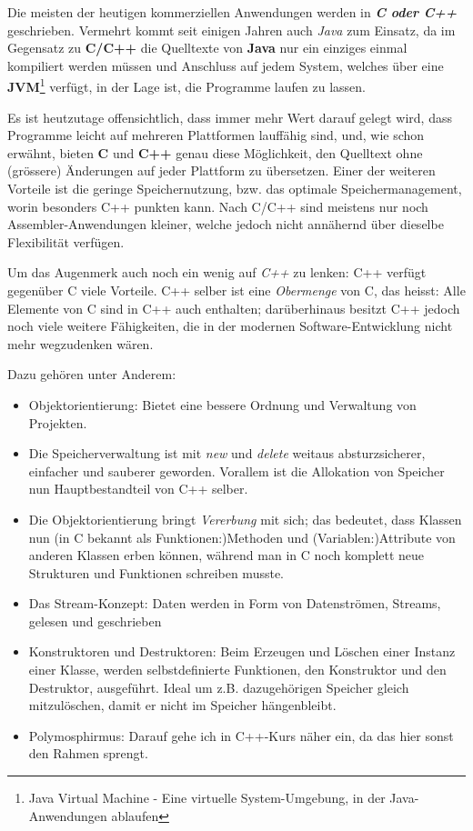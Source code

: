 \documentclass[b5paper,10pt,dvips,fleqn,titlepage,twoside]{book}
\begin{document}
Die meisten der heutigen kommerziellen Anwendungen werden in \emph{\textbf{C oder C++}} geschrieben. Vermehrt kommt seit einigen Jahren auch \emph{Java} zum Einsatz, da im Gegensatz zu \textbf{C/C++} die Quelltexte von \textbf{Java} nur ein einziges einmal kompiliert werden müssen und Anschluss auf jedem System, welches über eine \textbf{\textbf{JVM}}\footnote{Java Virtual Machine - Eine virtuelle System-Umgebung, in der Java-Anwendungen ablaufen} verfügt, in der Lage ist, die Programme laufen zu lassen.

Es ist heutzutage offensichtlich, dass immer mehr Wert darauf gelegt wird, dass Programme leicht auf mehreren Plattformen lauffähig sind, und, wie schon erwähnt, bieten \textbf{C} und \textbf{C++} genau diese Möglichkeit, den Quelltext ohne (grössere) Änderungen auf jeder Plattform zu übersetzen. Einer der weiteren Vorteile ist die geringe Speichernutzung, bzw. das optimale Speichermanagement, worin besonders C++ punkten kann. Nach C/C++ sind meistens nur noch Assembler-Anwendungen kleiner, welche jedoch nicht annähernd über dieselbe Flexibilität verfügen.

Um das Augenmerk auch noch ein wenig auf \emph{C++} zu lenken: C++ verfügt gegenüber C viele Vorteile. C++ selber ist eine \emph{Obermenge} von C, das heisst: Alle Elemente von C sind in C++ auch enthalten; darüberhinaus besitzt C++ jedoch noch viele weitere Fähigkeiten, die in der modernen Software-Entwicklung nicht mehr wegzudenken wären.

Dazu gehören unter Anderem:\newline

\begin{itemize}
 \item Objektorientierung: Bietet eine bessere Ordnung und Verwaltung von Projekten.
\item Die Speicherverwaltung ist mit \emph{new} und \emph{delete} weitaus absturzsicherer, einfacher und sauberer geworden. Vorallem ist die Allokation von Speicher nun Hauptbestandteil von C++ selber.
\item Die Objektorientierung bringt \emph{Vererbung} mit sich; das bedeutet, dass Klassen nun (in C bekannt als Funktionen:)Methoden und (Variablen:)Attribute von anderen Klassen erben können, während man in C noch komplett neue Strukturen und Funktionen schreiben musste.
\item Das Stream-Konzept: Daten werden in Form von Datenströmen, Streams, gelesen und geschrieben
\item Konstruktoren und Destruktoren: Beim Erzeugen und Löschen einer Instanz einer Klasse, werden selbstdefinierte Funktionen, den Konstruktor und den Destruktor, ausgeführt. Ideal um z.B. dazugehörigen Speicher gleich mitzulöschen, damit er nicht im Speicher hängenbleibt.
\item Polymosphirmus: Darauf gehe ich in C++-Kurs näher ein, da das hier sonst den Rahmen sprengt.
\end{itemize}
\end{document}
